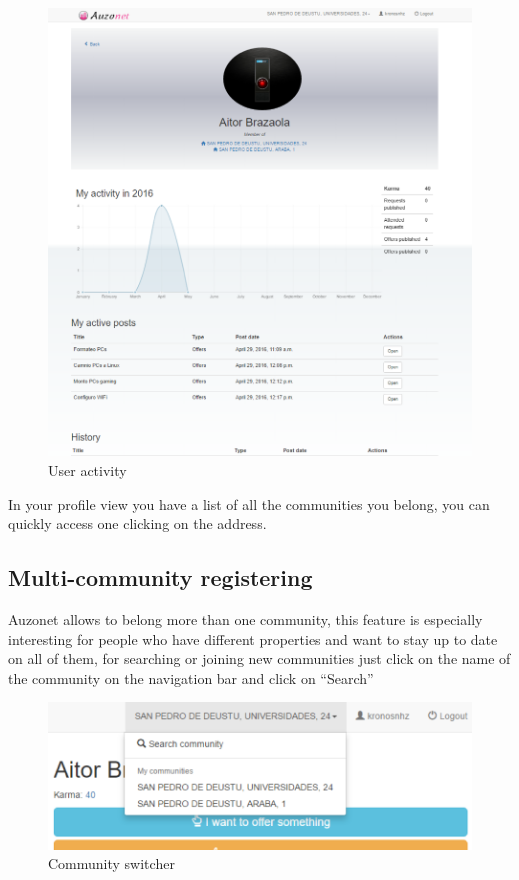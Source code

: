 \documentclass{DeustoFDP}
\begin{document}
\begin{figure}[h!]
\centering
\includegraphics[width=0.9\linewidth]{fig/Manual/profile}
\caption[User activity]{User activity}
\label{fig:profile}
\end{figure}


In your profile view you have a list of all the communities you belong, you can quickly access one clicking on the address.
\newpage
\subsection{Multi-community registering}
Auzonet allows to belong more than one community, this feature is especially interesting for people who have different properties and want to stay up to date on all of them, for searching or joining new communities just click on the name of the community on the navigation bar and click on “Search”

\begin{figure}[h!]
\centering
\includegraphics[width=0.9\linewidth]{fig/Manual/multiaccount}
\caption[Community switcher]{Community switcher}
\label{fig:multiaccount}
\end{figure}
\end{document}
